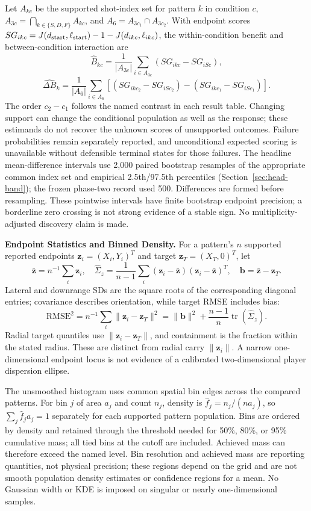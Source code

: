 \documentclass[11pt,letterpaper]{article}
\begin{document}
Let $A_{kc}$ be the supported shot-index set for pattern $k$ in condition $c$,
$A_{3c}=\bigcap_{k\in\{S,D,F\}}A_{kc}$, and
$A_6=A_{3c_1}\cap A_{3c_2}$. With endpoint scores
$SG_{ikc}=J(d_{\rm start},\ell_{\rm start})-1-J(d_{ikc},\ell_{ikc})$,
the within-condition benefit and between-condition interaction are
\[
 \widehat B_{kc}=\frac{1}{|A_{3c}|}\sum_{i\in A_{3c}}
       (SG_{ikc}-SG_{iSc}),
\]
\[
 \widehat{\Delta B}_k=\frac{1}{|A_6|}\sum_{i\in A_6}
 [(SG_{ikc_2}-SG_{iSc_2})-(SG_{ikc_1}-SG_{iSc_1})].
\]
The order $c_2-c_1$ follows the named contrast in each result table.
Changing support can change the conditional population as well as the response;
these estimands do not recover the unknown scores of unsupported outcomes.
Failure probabilities remain separately reported, and unconditional expected
scoring is unavailable without defensible terminal states for those failures.
The headline mean-difference intervals use 2,000 paired bootstrap resamples of
the appropriate common index set and empirical 2.5th/97.5th percentiles
(Section~\ref{sec:head-band}); the frozen phase-two record used 500. Differences
are formed before resampling. These pointwise intervals have finite bootstrap
endpoint precision; a borderline zero crossing is not strong evidence of a
stable sign. No multiplicity-adjusted discovery claim is made.

\textbf{Endpoint Statistics and Binned Density.} For a pattern's $n$ supported
reported endpoints $\mathbf z_i=(X_i,Y_i)^T$ and target
$\mathbf z_T=(X_T,0)^T$, let
\[
 \bar{\mathbf z}=n^{-1}\sum_i\mathbf z_i,\quad
 \widehat\Sigma_z=\frac{1}{n-1}\sum_i
 (\mathbf z_i-\bar{\mathbf z})(\mathbf z_i-\bar{\mathbf z})^T,
 \quad\mathbf b=\bar{\mathbf z}-\mathbf z_T.
\]
Lateral and downrange SDs are the square roots of the corresponding diagonal
entries; covariance describes orientation, while target RMSE includes bias:
\[
 \mathrm{RMSE}^2=n^{-1}\sum_i\|\mathbf z_i-\mathbf z_T\|^2
 =\|\mathbf b\|^2+\frac{n-1}{n}\operatorname{tr}(\widehat\Sigma_z).
\]
Radial target quantiles use $\|\mathbf z_i-\mathbf z_T\|$, and containment is
the fraction within the stated radius. These are distinct from radial carry
$\|\mathbf z_i\|$. A narrow one-dimensional endpoint locus is not evidence of
a calibrated two-dimensional player dispersion ellipse.

The unsmoothed histogram uses common spatial bin edges across the compared
patterns. For bin $j$ of area $a_j$ and count $n_j$, density is
$\widehat f_j=n_j/(n a_j)$, so $\sum_j\widehat f_j a_j=1$ separately for each
supported pattern population. Bins are ordered by density and retained through
the threshold needed for 50\%, 80\%, or 95\% cumulative mass; all tied bins at
the cutoff are included. Achieved mass can therefore exceed the named level.
Bin resolution and achieved mass are reporting quantities, not physical
precision; these regions depend on the grid and are not smooth population
density estimates or confidence regions for a mean. No Gaussian width or KDE
is imposed on singular or nearly one-dimensional samples.
\end{document}
